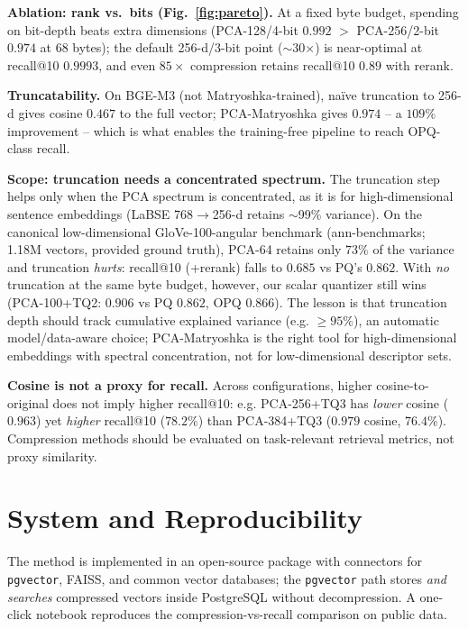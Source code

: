 \documentclass[sigconf, nonacm]{acmart}
\begin{document}
\textbf{Ablation: rank vs.\ bits (Fig.~\ref{fig:pareto}).} At a fixed byte
budget, spending on bit-depth beats extra dimensions (PCA-128/4-bit $0.992$ $>$
PCA-256/2-bit $0.974$ at 68 bytes); the default 256-d/3-bit point
($\sim$30$\times$) is near-optimal at recall@10 $0.9993$, and even $85\times$
compression retains recall@10 $0.89$ with rerank.

\textbf{Truncatability.} On BGE-M3 (not Matryoshka-trained), na\"ive truncation
to 256-d gives cosine $0.467$ to the full vector; PCA-Matryoshka gives $0.974$ --
a $109\%$ improvement -- which is what enables the training-free pipeline to reach
OPQ-class recall.

\textbf{Scope: truncation needs a concentrated spectrum.} The truncation step helps
only when the PCA spectrum is concentrated, as it is for high-dimensional sentence
embeddings (LaBSE 768$\to$256-d retains $\sim$99\% variance). On the canonical
low-dimensional GloVe-100-angular benchmark (ann-benchmarks; 1.18M vectors, provided
ground truth), PCA-64 retains only $73\%$ of the variance and truncation \emph{hurts}:
recall@10 (+rerank) falls to $0.685$ vs PQ's $0.862$. With \emph{no} truncation at
the same byte budget, however, our scalar quantizer still wins (PCA-100+TQ2: $0.906$
vs PQ $0.862$, OPQ $0.866$). The lesson is that truncation depth should track
cumulative explained variance (e.g. $\geq 95\%$), an automatic model/data-aware choice;
PCA-Matryoshka is the right tool for high-dimensional embeddings with spectral
concentration, not for low-dimensional descriptor sets.

\textbf{Cosine is not a proxy for recall.} Across configurations, higher
cosine-to-original does not imply higher recall@10: e.g. PCA-256+TQ3 has
\emph{lower} cosine ($0.963$) yet \emph{higher} recall@10 ($78.2\%$) than
PCA-384+TQ3 ($0.979$ cosine, $76.4\%$). Compression methods should be evaluated
on task-relevant retrieval metrics, not proxy similarity.

\section{System and Reproducibility}
The method is implemented in an open-source package with connectors for
\texttt{pgvector}, FAISS, and common vector databases; the \texttt{pgvector}
path stores \emph{and searches} compressed vectors inside PostgreSQL without
decompression. A one-click notebook reproduces the compression-vs-recall
comparison on public data. %
\end{document}

